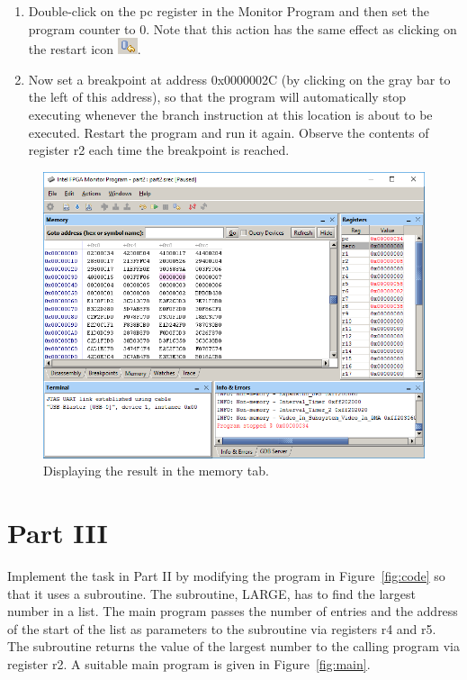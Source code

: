 \documentclass[epsfig,10pt,fullpage]{article}
\begin{document}
\begin{enumerate}
\item Double-click on the {\sf pc} register in the Monitor Program and then set the program
		  counter to 0. Note that this action has the same effect as
clicking on the restart icon \hbox{\includegraphics[scale=0.8]{figures/icon_restart.png}}. 
\item Now set a breakpoint at address {\sf 0x0000002C} (by clicking on the gray bar to
the left of this address), so that the program will 
automatically stop executing whenever the branch instruction at this location is about to
be executed. Restart the program and run it again.  Observe the contents of register r2 each time
the breakpoint is reached.

\end{enumerate}

\begin{figure}[h]
	\begin{center}
	\includegraphics[scale=0.58]{figures/figureMP_mem.png}
	\end{center}
	\vspace{-0.5cm}\caption{Displaying the result in the memory tab.}
\label{fig:MP_mem}
\end{figure}

\newpage

\section*{Part III}
Implement the task in Part II by modifying the program in Figure~\ref{fig:code} so that it
uses a subroutine. The subroutine, LARGE, has to find the largest number in a list.
The main program passes the number of entries and the address of the start of the
list as parameters to the subroutine via registers r4 and r5.
The subroutine returns the value of the largest number to the calling program
via register r2. A suitable main program is given in Figure~\ref{fig:main}.
~\\
\end{document}
